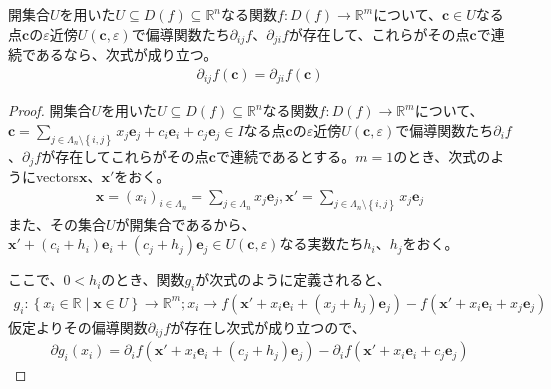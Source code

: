 \documentclass[dvipdfmx]{jsarticle}
\begin{document}
\begin{thm}\label{4.2.3.5}
開集合$U$を用いた$U \subseteq D(f) \subseteq \mathbb{R}^{n}$なる関数$f:D(f) \rightarrow \mathbb{R}^{m}$について、$\mathbf{c} \in U$なる点$\mathbf{c}$の$\varepsilon$近傍$U\left( \mathbf{c},\varepsilon \right)$で偏導関数たち$\partial_{ij}f$、$\partial_{ji}f$が存在して、これらがその点$\mathbf{c}$で連続であるなら、次式が成り立つ。
\begin{align*}
\partial_{ij}f\left( \mathbf{c} \right) = \partial_{ji}f\left( \mathbf{c} \right)
\end{align*}
\end{thm}
\begin{proof}
開集合$U$を用いた$U \subseteq D(f) \subseteq \mathbb{R}^{n}$なる関数$f:D(f) \rightarrow \mathbb{R}^{m}$について、$\mathbf{c} = \sum_{j \in \varLambda_{n} \setminus \left\{ i,j \right\}} {x_{j}\mathbf{e}_{j}} + c_{i}\mathbf{e}_{i} + c_{j}\mathbf{e}_{j} \in I$なる点$\mathbf{c}$の$\varepsilon$近傍$U\left( \mathbf{c},\varepsilon \right)$で偏導関数たち$\partial_{i}f$、$\partial_{j}f$が存在してこれらがその点$\mathbf{c}$で連続であるとする。$m = 1$のとき、次式のようにvectors$\mathbf{x}$、$\mathbf{x}'$をおく。
\begin{align*}
\mathbf{x} = \left( x_{i} \right)_{i \in \varLambda_{n}} = \sum_{j \in \varLambda_{n}} {x_{j}\mathbf{e}_{j}},\mathbf{x}' = \sum_{j \in \varLambda_{n} \setminus \left\{ i,j \right\}} {x_{j}\mathbf{e}_{j}}
\end{align*}
また、その集合$U$が開集合であるから、$\mathbf{x}' + \left( c_{i} + h_{i} \right)\mathbf{e}_{i} + \left( c_{j} + h_{j} \right)\mathbf{e}_{j} \in U\left( \mathbf{c},\varepsilon \right)$なる実数たち$h_{i}$、$h_{j}$をおく。\par
ここで、$0 < h_{i}$のとき、関数$g_{i}$が次式のように定義されると、
\begin{align*}
g_{i}:\left\{ x_{i} \in \mathbb{R} \middle| \mathbf{x} \in U \right\} \rightarrow \mathbb{R}^{m};x_{i} \rightarrow f\left( \mathbf{x}' + x_{i}\mathbf{e}_{i} + \left( x_{j} + h_{j} \right)\mathbf{e}_{j} \right) - f\left( \mathbf{x}' + x_{i}\mathbf{e}_{i} + x_{j}\mathbf{e}_{j} \right)
\end{align*}
仮定よりその偏導関数$\partial_{ij}f$が存在し次式が成り立つので、
\begin{align*}
\partial g_{i}\left( x_{i} \right) = \partial_{i}f\left( \mathbf{x}' + x_{i}\mathbf{e}_{i} + \left( c_{j} + h_{j} \right)\mathbf{e}_{j} \right) - \partial_{i}f\left( \mathbf{x}' + x_{i}\mathbf{e}_{i} + c_{j}\mathbf{e}_{j} \right)
\end{align*}

\end{proof}
\end{document}
